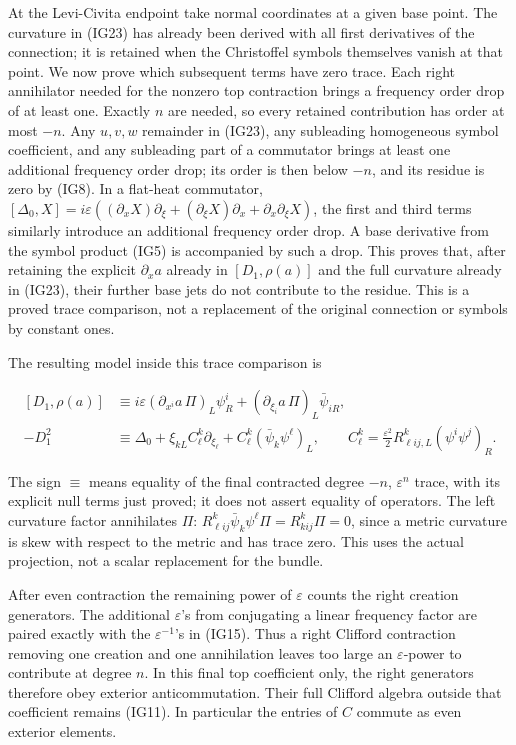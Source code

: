 \documentclass[
  11pt,
]{article}
\begin{document}
At the Levi-Civita endpoint take normal coordinates at a given base
point. The curvature in (IG23) has already been derived with all first
derivatives of the connection; it is retained when the Christoffel
symbols themselves vanish at that point. We now prove which subsequent
terms have zero trace. Each right annihilator needed for the nonzero top
contraction brings a frequency order drop of at least one. Exactly \(n\)
are needed, so every retained contribution has order at most \(-n\). Any
\(u,v,w\) remainder in (IG23), any subleading homogeneous symbol
coefficient, and any subleading part of a commutator brings at least one
additional frequency order drop; its order is then below \(-n\), and its
residue is zero by (IG8). In a flat-heat commutator,
\([\Delta_0,X]=i\varepsilon((\partial_xX)\partial_\xi+(\partial_\xi X)\partial_x+\partial_x\partial_\xi X)\),
the first and third terms similarly introduce an additional frequency
order drop. A base derivative from the symbol product (IG5) is
accompanied by such a drop. This proves that, after retaining the
explicit \(\partial_xa\) already in \([D_1,\rho(a)]\) and the full
curvature already in (IG23), their further base jets do not contribute
to the residue. This is a proved trace comparison, not a replacement of
the original connection or symbols by constant ones.

The resulting model inside this trace comparison is

\[
 \begin{split}
 [D_1,\rho(a)]&\equiv
      i\varepsilon(\partial_{x^i}a\,\Pi)_L\psi_R^i
       +(\partial_{\xi_i}a\,\Pi)_L\bar\psi_{iR},\\
 -D_1^2&\equiv \Delta_0+\xi_{kL}C^k_\ell\partial_{\xi_\ell}
                            +C^k_\ell(\bar\psi_k\psi^\ell)_L,
 \qquad C^k_\ell=\frac{\varepsilon^2}{2}
                        R^k_{\ell ij,L}(\psi^i\psi^j)_R.
 \end{split}
\tag{IG29}
\]

The sign \(\equiv\) means equality of the final contracted degree
\(-n\), \(\varepsilon^n\) trace, with its explicit null terms just
proved; it does not assert equality of operators. The left curvature
factor annihilates \(\Pi\):
\(R^k_{\ell ij}\bar\psi_k\psi^\ell\Pi=R^k_{kij}\Pi=0\), since a metric
curvature is skew with respect to the metric and has trace zero. This
uses the actual projection, not a scalar replacement for the bundle.

After even contraction the remaining power of \(\varepsilon\) counts the
right creation generators. The additional \(\varepsilon\)'s from
conjugating a linear frequency factor are paired exactly with the
\(\varepsilon^{-1}\)'s in (IG15). Thus a right Clifford contraction
removing one creation and one annihilation leaves too large an
\(\varepsilon\)-power to contribute at degree \(n\). In this final top
coefficient only, the right generators therefore obey exterior
anticommutation. Their full Clifford algebra outside that coefficient
remains (IG11). In particular the entries of \(C\) commute as even
exterior elements.
\end{document}
